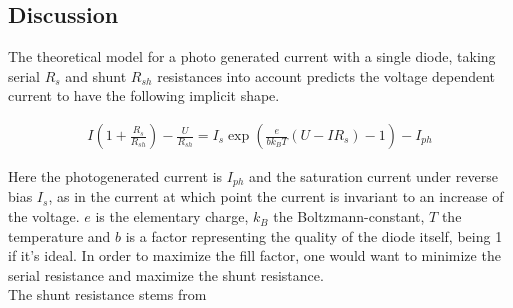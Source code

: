 \documentclass[a4paper,10pt,twocolumn]{article}
\begin{document}
\begin{extract*}

\section{Discussion}\label{sec:discussion}
The theoretical model for a photo generated current with a single diode, taking serial $R_s$ and shunt $R_{sh}$ resistances into account predicts the voltage dependent current to have the following implicit shape.\cite{source10}

\begin{align}
	I\left(1+\frac{R_s}{R_{sh}}\right)-\frac{U}{R_{sh}} = I_s\exp\left(\frac{e}{b k_B T}(U-I R_s)-1\right)-I_{ph}
\end{align}

Here the photogenerated current is $I_{ph}$ and the saturation current under reverse bias $I_s$, as in the current at which point the current is invariant to an increase of the voltage. $e$ is the elementary charge, $k_B$ the Boltzmann-constant, $T$ the temperature and $b$ is a factor representing the quality of the diode itself, being 1 if it's ideal. In order to maximize the fill factor, one would want to minimize the serial resistance and maximize the shunt resistance.\\
The shunt resistance stems from

\end{extract*}
\end{document}
